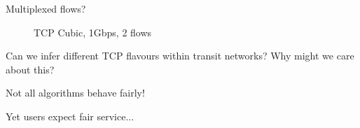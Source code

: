 \documentclass[aspectratio=169,xcolor={dvipsnames}
,notes
,handout
]{beamer}
\begin{document}
\begin{frame}{Multiplexed flows?}
	\begin{figure}
		\caption{TCP Cubic, 1Gbps, 2 flows}
	\end{figure}
\end{frame}

\begin{frame}{Can we infer different TCP flavours within transit networks?}
	Why might we care about this? \pause
	
	\alert{Not all algorithms behave fairly!} \pause
	
	Yet users expect fair service...
\end{frame}
\end{document}
